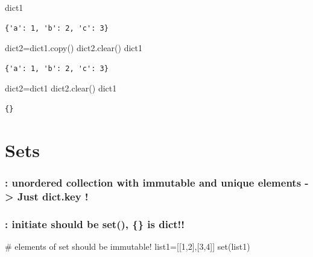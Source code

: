 \documentclass[
  a4paper,
  DIV=11,
  numbers=noendperiod]{scrreprt}
\newenvironment{Shaded}{\begin{snugshade}}{\end{snugshade}}
\newcommand{\BuiltInTok}[1]{\textcolor[rgb]{0.00,0.23,0.31}{#1}}
\newcommand{\CommentTok}[1]{\textcolor[rgb]{0.37,0.37,0.37}{#1}}
\newcommand{\DecValTok}[1]{\textcolor[rgb]{0.68,0.00,0.00}{#1}}
\newcommand{\NormalTok}[1]{\textcolor[rgb]{0.00,0.23,0.31}{#1}}
\newcommand{\OperatorTok}[1]{\textcolor[rgb]{0.37,0.37,0.37}{#1}}
\begin{document}
\begin{Shaded}
\begin{Highlighting}[]
\NormalTok{dict1}
\end{Highlighting}
\end{Shaded}

\begin{verbatim}
{'a': 1, 'b': 2, 'c': 3}
\end{verbatim}

\begin{Shaded}
\begin{Highlighting}[]
\NormalTok{dict2}\OperatorTok{=}\NormalTok{dict1.copy()}
\NormalTok{dict2.clear()}
\NormalTok{dict1}
\end{Highlighting}
\end{Shaded}

\begin{verbatim}
{'a': 1, 'b': 2, 'c': 3}
\end{verbatim}

\begin{Shaded}
\begin{Highlighting}[]
\NormalTok{dict2}\OperatorTok{=}\NormalTok{dict1}
\NormalTok{dict2.clear()}
\NormalTok{dict1}
\end{Highlighting}
\end{Shaded}

\begin{verbatim}
{}
\end{verbatim}

\section{Sets}\label{sets}

\subsubsection{: unordered collection with immutable and unique elements
-\textgreater{} Just dict.key
!}\label{unordered-collection-with-immutable-and-unique-elements---just-dict.key}

\subsubsection{: initiate should be set(), \{\} is
dict!!}\label{initiate-should-be-set-is-dict}

\begin{Shaded}
\begin{Highlighting}[]
\CommentTok{\# elements of set should be immutable!}
\NormalTok{list1}\OperatorTok{=}\NormalTok{[[}\DecValTok{1}\NormalTok{,}\DecValTok{2}\NormalTok{],[}\DecValTok{3}\NormalTok{,}\DecValTok{4}\NormalTok{]]}
\BuiltInTok{set}\NormalTok{(list1)}
\end{Highlighting}
\end{Shaded}
\end{document}
